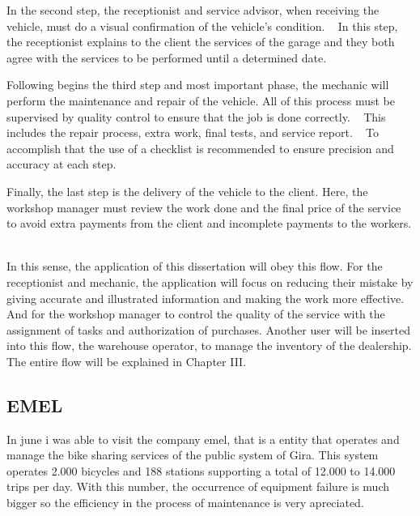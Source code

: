 In the second step, the receptionist and service advisor, when receiving the vehicle, must do a visual confirmation of the vehicle's condition. ~\cite{Setting_the_after_sale_process}
In this step, the receptionist explains to the client the services of the garage and they both agree with the services to be performed until a determined date. ~\cite{Setting_the_after_sale_process}

Following begins the third step and most important phase, the mechanic will perform the maintenance and repair of the vehicle. 
All of this process must be supervised by quality control to ensure that the job is done correctly. ~\cite{Setting_the_after_sale_process}
This includes the repair process, extra work, final tests, and service report. ~\cite{Setting_the_after_sale_process}
To accomplish that the use of a checklist is recommended to ensure precision and accuracy at each step. ~\cite{Setting_the_after_sale_process}

Finally, the last step is the delivery of the vehicle to the client. 
Here, the workshop manager must review the work done and the final price of the service to avoid extra payments from the client and incomplete payments to the workers. ~\cite{Setting_the_after_sale_process}

In this sense, the application of this dissertation will obey this flow.
For the receptionist and mechanic, the application will focus on reducing their mistake by giving accurate and illustrated information and making the work more effective.
And for the workshop manager to control the quality of the service with the assignment of tasks and authorization of purchases. 
Another user will be inserted into this flow, the warehouse operator, to manage the inventory of the dealership. 
The entire flow will be explained in Chapter III. 


\subsection{EMEL}
In june  i was able to visit the company \acs{emel}, that is a entity that operates and manage the bike sharing services of the public system of Gira.
This system operates 2.000 bicycles and 188 stations supporting a total of 12.000 to 14.000 trips per day.
With this number, the occurrence of equipment failure is much bigger so the efficiency in the process of maintenance is very apreciated.

